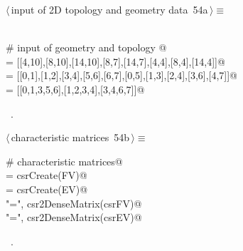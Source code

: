 \documentclass[11pt,oneside]{article}    %
\begin{document}
\begin{flushleft} \small \label{scrap87}
\protect{}$\langle\,$input of 2D topology and geometry data\nobreak\ {\footnotesize 54a}$\,\rangle\equiv$
\vspace{-1ex}
\begin{list}{}{} \item
\mbox{}\verb@@\\
\mbox{}\verb@# input of geometry and topology  @\\
\mbox{} = [[4,10],[8,10],[14,10],[8,7],[14,7],[4,4],[8,4],[14,4]]@\\
\mbox{}\verb@EV = [[0,1],[1,2],[3,4],[5,6],[6,7],[0,5],[1,3],[2,4],[3,6],[4,7]]@\\
\mbox{}\verb@FV = [[0,1,3,5,6],[1,2,3,4],[3,4,6,7]]@\\
\mbox{}\verb@@{\NWsep}
\end{list}
\vspace{-1ex}
\footnotesize\addtolength{\baselineskip}{-1ex}
\begin{list}{}{\setlength{\itemsep}{-\parsep}\setlength{\itemindent}{-\leftmargin}}
\item \NWtxtMacroRefIn\ .
\end{list}
\end{flushleft}

\begin{flushleft} \small \label{scrap88}
\protect{}$\langle\,$characteristic matrices\nobreak\ {\footnotesize 54b}$\,\rangle\equiv$
\vspace{-1ex}
\begin{list}{}{} \item
\mbox{}\verb@# characteristic matrices@\\
\mbox{}\verb@csrFV = csrCreate(FV)@\\
\mbox{}\verb@csrEV = csrCreate(EV)@\\
\mbox{}\verb@print "\nFV =\n", csr2DenseMatrix(csrFV)@\\
\mbox{}\verb@print "\nEV =\n", csr2DenseMatrix(csrEV)@\\
\mbox{}\verb@@{\NWsep}
\end{list}
\vspace{-1ex}
\footnotesize\addtolength{\baselineskip}{-1ex}
\begin{list}{}{\setlength{\itemsep}{-\parsep}\setlength{\itemindent}{-\leftmargin}}
\item \NWtxtMacroRefIn\ .
\end{list}
\end{flushleft}
\end{document}
